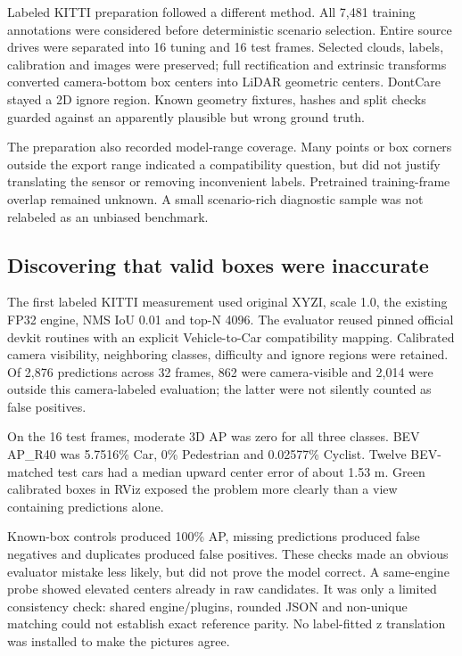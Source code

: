 \documentclass[11pt,a4paper]{article}
\newcommand{\code}[1]{\texttt{\detokenize{#1}}}
\begin{document}
Labeled KITTI preparation followed a different method. All 7,481 training annotations were considered before deterministic scenario selection. Entire source drives were separated into 16 tuning and 16 test frames. Selected clouds, labels, calibration and images were preserved; full rectification and extrinsic transforms converted camera-bottom box centers into LiDAR geometric centers. DontCare stayed a 2D ignore region. Known geometry fixtures, hashes and split checks guarded against an apparently plausible but wrong ground truth.

The preparation also recorded model-range coverage. Many points or box corners outside the export range indicated a compatibility question, but did not justify translating the sensor or removing inconvenient labels. Pretrained training-frame overlap remained unknown. A small scenario-rich diagnostic sample was not relabeled as an unbiased benchmark.

\subsection{Discovering that valid boxes were inaccurate}

The first labeled KITTI measurement used original XYZI, scale 1.0, the existing FP32 engine, NMS IoU 0.01 and top-N 4096. The evaluator reused pinned official devkit routines with an explicit Vehicle-to-Car compatibility mapping. Calibrated camera visibility, neighboring classes, difficulty and ignore regions were retained. Of 2,876 predictions across 32 frames, 862 were camera-visible and 2,014 were outside this camera-labeled evaluation; the latter were not silently counted as false positives.

On the 16 test frames, moderate 3D AP was zero for all three classes. BEV AP\_R40 was 5.7516\% Car, 0\% Pedestrian and 0.02577\% Cyclist. Twelve BEV-matched test cars had a median upward center error of about 1.53 m. Green calibrated boxes in RViz exposed the problem more clearly than a view containing predictions alone.

Known-box controls produced 100\% AP, missing predictions produced false negatives and duplicates produced false positives. These checks made an obvious evaluator mistake less likely, but did not prove the model correct. A same-engine \code{trtexec} probe showed elevated centers already in raw candidates. It was only a limited consistency check: shared engine/plugins, rounded JSON and non-unique matching could not establish exact reference parity. No label-fitted z translation was installed to make the pictures agree.
\end{document}

